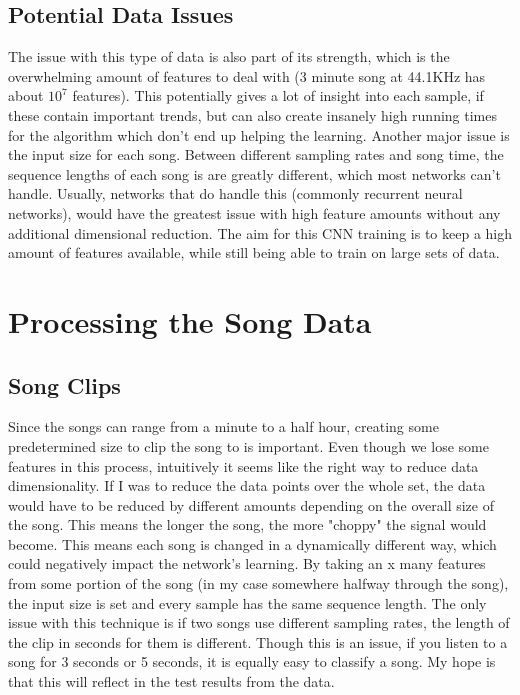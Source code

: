 \documentclass{article}
\begin{document}
\subsection{Potential Data Issues}
The issue with this type of data is also part of its strength, which is the overwhelming amount of features to deal with (3 minute song at 44.1KHz has about $10^{7}$ features). This potentially gives a lot of insight into each sample, if these contain important trends, but can also create insanely high running times for the algorithm which don't end up helping the learning. Another major issue is the input size for each song. Between different sampling rates and song time, the sequence lengths of each song is are greatly different, which most networks can't handle. Usually, networks that do handle this (commonly recurrent neural networks), would have the greatest issue with high feature amounts without any additional dimensional reduction. The aim for this CNN training is to keep a high amount of features available, while still being able to train on large sets of data.
\section{Processing the Song Data}
\subsection{Song Clips}
Since the songs can range from a minute to a half hour, creating some predetermined size to clip the song to is important. Even though we lose some features in this process, intuitively it seems like the right way to reduce data dimensionality. If I was to reduce the data points over the whole set, the data would have to be reduced by different amounts depending on the overall size of the song. This means the longer the song, the more "choppy" the signal would become. This means each song is changed in a dynamically different way, which could negatively impact the network's learning. By taking an x many features from some portion of the song (in my case somewhere halfway through the song), the input size is set and every sample has the same sequence length. The only issue with this technique is if two songs use different sampling rates, the length of the clip in seconds for them is different. Though this is an issue, if you listen to a song for 3 seconds or 5 seconds, it is equally easy to classify a song. My hope is that this will reflect in the test results from the data. 
\end{document}
